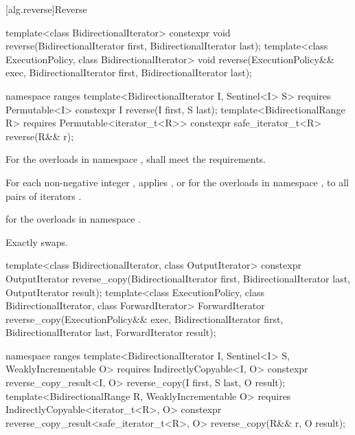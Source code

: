 [alg.reverse]{Reverse}

%
\begin{itemdecl}
template<class BidirectionalIterator>
  constexpr void reverse(BidirectionalIterator first, BidirectionalIterator last);
template<class ExecutionPolicy, class BidirectionalIterator>
  void reverse(ExecutionPolicy&& exec,
               BidirectionalIterator first, BidirectionalIterator last);

namespace ranges {
  template<BidirectionalIterator I, Sentinel<I> S>
    requires Permutable<I>
    constexpr I reverse(I first, S last);
  template<BidirectionalRange R>
    requires Permutable<iterator_t<R>>
    constexpr safe_iterator_t<R> reverse(R&& r);
}
\end{itemdecl}

\begin{itemdescr}
\pnum
\requires
For the overloads in namespace ,
 shall meet the
 requirements.

\pnum
\effects
For each non-negative integer
,
applies
, or
 for the overloads in namespace ,
to all pairs of iterators
.

\pnum
\returns
{} for the overloads in namespace .

\pnum
\complexity
Exactly
swaps.
\end{itemdescr}

%
\begin{itemdecl}
template<class BidirectionalIterator, class OutputIterator>
  constexpr OutputIterator
    reverse_copy(BidirectionalIterator first, BidirectionalIterator last,
                 OutputIterator result);
template<class ExecutionPolicy, class BidirectionalIterator, class ForwardIterator>
  ForwardIterator
    reverse_copy(ExecutionPolicy&& exec,
                 BidirectionalIterator first, BidirectionalIterator last,
                 ForwardIterator result);

namespace ranges {
  template<BidirectionalIterator I, Sentinel<I> S, WeaklyIncrementable O>
    requires IndirectlyCopyable<I, O>
    constexpr reverse_copy_result<I, O>
      reverse_copy(I first, S last, O result);
  template<BidirectionalRange R, WeaklyIncrementable O>
    requires IndirectlyCopyable<iterator_t<R>, O>
    constexpr reverse_copy_result<safe_iterator_t<R>, O>
      reverse_copy(R&& r, O result);
}
\end{itemdecl}


